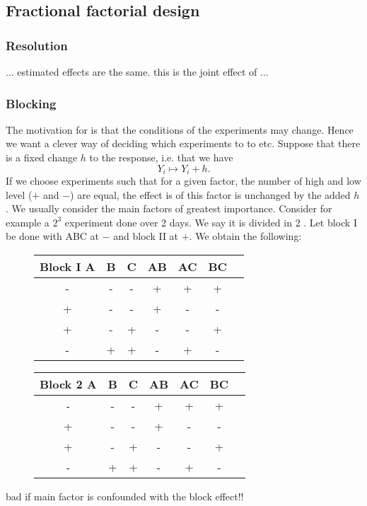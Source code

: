 \subsection{Fractional factorial design}



\subsubsection{Resolution}




 ... estimated effects are the same. this is the joint effect of ...


\subsubsection{Blocking}

The motivation for  is that the conditions of the experiments may change. Hence we want a clever way of deciding which experiments to to  etc. Suppose that there is a fixed change $h$ to the response, i.e. that  we have
$$
    Y_i \mapsto Y_i + h.
$$
If we choose experiments such that for a given factor, the number of high and low level ($+$ and $-$) are equal, the effect is of this factor is unchanged by the added $h$. We usually consider the main factors of greatest importance. Consider for example a $2^3$ experiment done over 2 days. We say it is divided in 2 . Let block I be done with ABC at $-$ and block II at $+$. We obtain the following:

\begin{figure}[H]\centering
    \begin{tabular}{ccccccc}
        Block I
        \toprule
        A & B & C & AB & AC & BC \\
        \midrule
        - & - & - & + & + & + \\
        + & - & - & + & - & - \\
        + & - & + & - & - & + \\
        - & + & + & - & + & - \\
        \bottomrule
    \end{tabular}        
        \quad
    \begin{tabular}{ccccccc}
        Block 2
        \toprule
        A & B & C & AB & AC & BC \\
        \midrule
        - & - & - & + & + & + \\
        + & - & - & + & - & - \\
        + & - & + & - & - & + \\
        - & + & + & - & + & - \\
        \bottomrule
    \end{tabular}        
\end{figure}

bad if main factor is confounded with the block effect!!
